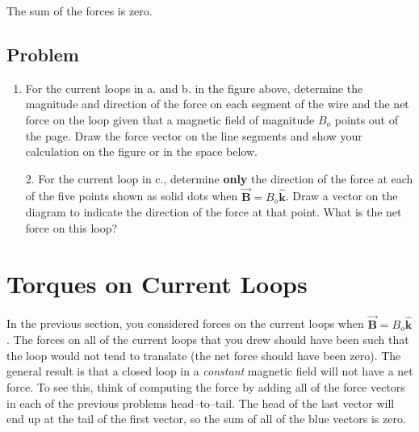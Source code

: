 \documentclass{article}
\newcommand{\khat}[0]{\hat{\boldsymbol{k}}}
\newcommand{\bfvec}[1]{\vec{\mathbf{#1}}}
\begin{document}
The sum of the forces is zero.

\subsection{Problem}

\ifsolutions


\else


\fi
\ifsolutions\else

\fi

\begin{enumerate}

  \item For the current loops in a. and b. in the figure above, determine the magnitude and direction of the force on each segment of the wire and the net force on the loop given that a magnetic field of magnitude $B_o$ points out of the page. Draw the force vector on the line segments and show your calculation on the figure or in the space below.

\end{enumerate}

\ifsolutions

\else
\vskip 169.5pt
\fi
\ifsolutions\else
\vskip 169.5pt
\fi

\begin{enumerate}

  \item[2.] For the current loop in c., determine {\bf only} the direction of the force at each of the five points shown as solid dots when $\bfvec{B}=B_o\khat$. Draw a vector on the diagram to indicate the direction of the force at that point. What is the net force on this loop?

\end{enumerate}

\newpage

\section{Torques on Current Loops}

In the previous section, you considered forces on the current loops when $\bfvec{B}=B_o\khat$. The forces on all of the current loops that you drew should have been such that the loop would not tend to translate (the net force should have been zero). The general result is that a closed loop in a \emph{constant} magnetic field will not have a net force. To see this, think of computing the force by adding all of the force vectors in each of the previous problems head--to--tail. The head of the last vector will end up at the tail of the first vector, so the sum of all of the blue vectors is zero.
\end{document}
